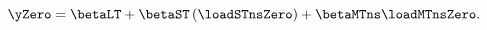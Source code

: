 \begin{equation} \label{eq:NSzero}
	\yZero = \betaLT + \betaST \left(\loadSTnsZero\right) + \betaMTns \loadMTnsZero. 
\end{equation}